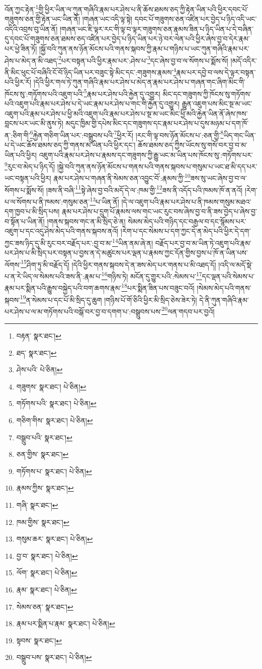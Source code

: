 འོན་ཀྱང་རྟེན་\footnote{བརྟན་  སྣར་ཐང་། }གྱི་ཕྱིར་ཡིན་ལ་ཀུན་གཞིའི་རྣམ་པར་ཤེས་པ་ནི་ཆོས་ཐམས་ཅད་ཀྱི་རྟེན་ཡིན་པའི་ཕྱིར་དབང་པོ་གཟུགས་ཅན་གྱི་རྟེན་ཡང་ཡིན་ནོ། །གཞན་ཡང་འདི་ལྟ་སྟེ། དབང་པོ་གཟུགས་ཅན་འཛིན་པར་བྱེད་པ་ཉིད་འདི་ཡང་འདིའི་འབྲས་བུ་ཡིན་ནོ། །གཞན་ཡང་ཇི་ལྟར་རང་གི་ལྟ་བ་ལྟར་གཟུགས་ཅན་རྣམས་ཟིན་པ་ཉིད་ཡིན་པ་དེ་བཞིན་དུ་དབང་པོ་གཟུགས་ཅན་ཐམས་ཅད་འཛིན་པར་བྱེད་པ་ཉིད་ཡིན་པར་ཉེ་བར་ལེན་པའི་ཕྱིར་ཞེས་བྱ་བ་དེར་རྣམ་པར་ཕྱེ་ཟིན་ཏོ། །སྐྱོ་བའི་ཀུན་ནས་ཉོན་མོངས་པའི་གནས་སྐབས་ཀྱི་རྣམ་པ་གཉིས་པ་ཡང་ཀུན་གཞིའི་རྣམ་པར་ཤེས་པ་མེད་ན་མི་འཐད་\footnote{ཐད་  སྣར་ཐང་། }པར་བསྟན་པའི་ཕྱིར་རྣམ་པར་:ཤེས་པ་\footnote{ཤེས་པའི་  པེ་ཅིན། }དང་ཞེས་བྱ་བ་ལ་སོགས་པ་སྨོས་སོ། །མདོ་འདིར་ནི་མིང་ཕུང་པོ་བཞིའི་ངོ་བོ་ཉིད་ཡིན་པར་བཟུང་སྟེ་མིང་དང་:གཟུགས་རྣམས་\footnote{གཟུགས་  སྣར་ཐང་།  པེ་ཅིན། }རྣམ་པར་དབྱེ་བ་ལས་དེ་ལྟར་བསྟན་པའི་ཕྱིར་རོ། །དེའི་ཕྱིར་གལ་ཏེ་ཀུན་གཞིའི་རྣམ་པར་ཤེས་པ་མེད་ན་རྣམ་པར་ཤེས་པ་གཞན་གང་ཞིག་མིང་གི་ཁོངས་སུ་:གཏོགས་པའི་འཇུག་པའི་\footnote{གཏོགས་པའི་  སྣར་ཐང་།  པེ་ཅིན། }རྣམ་པར་ཤེས་པའི་རྐྱེན་དུ་འགྱུར། མིང་དང་གཟུགས་ཀྱི་ཁོངས་སུ་གཏོགས་པའི་འཇུག་པའི་རྣམ་པར་ཤེས་པ་དེ་ཡང་རྣམ་པར་ཤེས་པ་གང་གི་རྐྱེན་དུ་འགྱུར། རྒྱུན་འཇུག་པས་མིང་སྔ་མ་ཡང་འཇུག་པའི་རྣམ་པར་ཤེས་པ་ཕྱི་མའི་འཇུག་པའི་རྣམ་པར་ཤེས་པ་སྔ་མ་ཡང་མིང་ཕྱི་མའི་རྐྱེན་ཡིན་ནོ་ཞེས་ཁས་བླངས་པར་ཡང་མི་ནུས་ཏེ། མདུང་ཁྱིམ་གྱི་དཔེས་མིང་དང་གཟུགས་དང་རྣམ་པར་ཤེས་པ་དུས་མཉམ་པ་དག་ཁོ་ན་:ཅིག་གི་\footnote{གཅིག་གིས་  སྣར་ཐང་།  པེ་ཅིན། }རྐྱེན་གཅིག་ཡིན་པར་:བསྒྲུབས་པའི་\footnote{བསྒྲུབ་པའི་  སྣར་ཐང་། }ཕྱིར་རོ། །རང་གི་ལྟ་བས་ཉོན་མོངས་པ་:ཅན་གྱི་\footnote{ཅན་གྱིས་  སྣར་ཐང་། }ཡིད་གང་ཡིན་པ་དེ་ཡང་ཆོས་ཐམས་ཅད་ཀྱི་གནས་མ་ཡིན་པའི་ཕྱིར་དང་། ཆོས་ཐམས་ཅད་ཀྱིས་ཡོངས་སུ་གསོ་བར་བྱ་བ་མ་ཡིན་པའི་ཕྱིར། འཇུག་པའི་རྣམ་པར་ཤེས་པ་རྣམས་དང་གཟུགས་ཀྱི་རྒྱུ་ཡང་མ་ཡིན་པས་ཁོངས་སུ་:གཏོགས་པར་\footnote{གཏོགས་པ་  སྣར་ཐང་།  པེ་ཅིན། }རུང་བ་མེད་པ་ཉིད་དོ། །སྐྱེ་བའི་ཀུན་ནས་ཉོན་མོངས་པ་གནས་པའི་གནས་སྐབས་པ་གསུམ་པ་ཡང་ཐ་མི་དད་པར་ཡང་བསྟན་པའི་ཕྱིར། རྣམ་པར་ཤེས་པ་གཞན་ནི་སེམས་ཅན་འབྱུང་བོ་:རྣམས་ཀྱི་\footnote{རྣམས་ཀྱིས་  སྣར་ཐང་། }ཟས་སུ་ཡང་ཞེས་བྱ་བ་ལ་སོགས་པ་སྨོས་སོ། །ཟས་ནི་བཞི་\footnote{གཞི་  སྣར་ཐང་། }སྟེ་ཞེས་བྱ་བའི་མདོ་དེ་ལ་:ཁམ་གྱི་\footnote{ཁམ་གྱིས་  སྣར་ཐང་། }ཟས་ནི་འདོད་པའི་ཁམས་ཁོ་ན་ནའོ། །རེག་པ་ལ་སོགས་པ་ནི་ཁམས་:གསུམ་ཅན་\footnote{གསུམ་ཆར་  སྣར་ཐང་།  པེ་ཅིན། }པ་ཡིན་ནོ། །དེ་ལ་འཇུག་པའི་རྣམ་པར་ཤེས་པ་ནི་ཁམས་གསུམ་མཐའ་དག་ཁྱབ་པ་མི་སྲིད་པས། རྣམ་པར་ཤེས་པ་དྲུག་པོ་རྣམས་ལས་གང་ཡང་རུང་བས་ཞེས་བྱ་བ་ནི་ཟས་བྱེད་པ་ཞེས་བྱ་བ་སྟོན་པ་ཡིན་ནོ། །གནས་སྐབས་གང་ན་མི་སྲིད་ཅེ་ན། སེམས་མེད་པའི་གཉིད་དང་བརྒྱལ་བ་དང་སྙོམས་པར་འཇུག་པ་དང་འདུ་ཤེས་མེད་པའི་གནས་སྐབས་ནའོ། །རེག་པ་དང་སེམས་པ་དག་ཀྱང་དེ་ན་མེད་པའི་ཕྱིར་དེ་དག་ཀྱང་ཟས་ཉིད་དུ་མི་རུང་བར་བརྗོད་པར་:བྱ་བ་མ་\footnote{བྱ་བ་  སྣར་ཐང་།  པེ་ཅིན། }ཡིན་ནམ་ཞེ་ན། བརྗོད་པར་བྱ་བ་མ་ཡིན་ཏེ་འཇུག་པའི་རྣམ་པར་ཤེས་པ་མི་སྲིད་པར་བསྟན་པ་བྱས་ན་དེ་མཚུངས་པར་ལྡན་པ་རྣམས་ཀྱང་དོན་གྱིས་བྱས་པ་ཁོ་ན་ཡིན་པས་ལོགས་\footnote{ལོག་  སྣར་ཐང་།  པེ་ཅིན། }ཤིག་ཏུ་མི་བརྗོད་དོ། །དེའི་ཕྱིར་གནས་སྐབས་དེ་ན་ཟས་མེད་པར་གནས་པ་མི་འཐད་དོ། །འདི་ལ་མདོ་སྡེ་པ་ན་རེ་ཡིད་ལ་སེམས་པའི་ཟས་ནི་:རྣམ་པ་\footnote{རྣམ་  སྣར་ཐང་།  པེ་ཅིན། }གཉིས་ཏེ། མངོན་དུ་གྱུར་པའི་:སེམས་པ་\footnote{སེམས་ཅན་  སྣར་ཐང་། }དང་ལྡན་པའི་སེམས་པ་རྣམ་པར་སྨིན་པའི་རྒྱུས་བསྐྱེད་པའི་བག་ཆགས་རྣམ་\footnote{རྣམ་པར་སྨིན་པ་རྣམ་  སྣར་ཐང་།  པེ་ཅིན། }པར་སྨིན་ཟིན་པས་བཟུང་བའོ། །སེམས་མེད་པའི་གནས་སྐབས་\footnote{སྟབས་  སྣར་ཐང་། }ན་སེམས་པ་དང་པོ་མི་སྲིད་དུ་ཆུག །གཉིས་པོ་གོ་ཅིའི་ཕྱིར་མི་སྲིད་ཅེས་ཟེར་ཏེ། དེ་ནི་ཀུན་གཞིའི་རྣམ་པར་ཤེས་པ་ལ་མ་གཏོགས་པའི་བསྒོ་བར་བྱ་བ་དགག་པ་:བསྒྲུབས་པས་\footnote{བསྒྲུབ་པས་  སྣར་ཐང་།  པེ་ཅིན། }ལན་གདབ་པར་བྱའོ། 